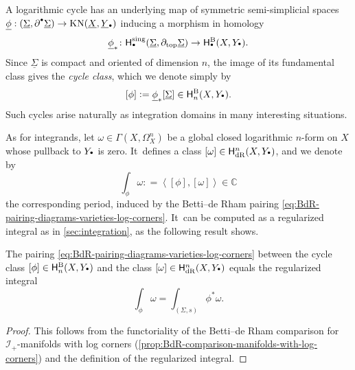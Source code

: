 \documentclass[JEP,XML,SOM,Unicode,NoFloatCountersInSection,published]{cedram}
\let\oldbullet\bullet
\renewcommand{\bullet}{{\raisebox{1pt}{$\scriptscriptstyle\oldbullet$}}}
\theoremstyle{definition}
\theoremstyle{remark}
\let\defn\emph
\newcommand{\CC}{\mathbb{C}}
\newcommand{\defas}{\mathrel{\mathop:}=}
\newcommand{\abrac}[1]{\left\langle#1\right\rangle}
\newcommand{\Sig}{\Sigma}
\newcommand{\uSig}{\underline{\Sigma}}
\newcommand{\uphi}{\underline{\phi}}
\newcommand{\uX}{\underline{X}}
\newcommand{\uY}{\underline{Y}}
\newcommand{\KN}[1]{\mathrm{KN}(#1)}
\newcommand{\sect}[1]{\mathsf{\Gamma}(#1)}
\newcommand{\HdR}[2][\bullet]{\mathsf{H}_{\mathrm{dR}}^{#1}(#2)}
\newcommand{\HlgyB}[2][\bullet]{\mathsf{H}^{\mathrm{B}}_{#1}(#2)}
\newcommand{\ascat}{\mathscr{I}_+}
\begin{document}
A logarithmic cycle has an underlying map of symmetric semi-simplicial spaces $\uphi:(\uSig,\partial^\bullet\uSig) \to \KN{\uX,\uY_\bullet}$ inducing a morphism in homology
\[
\underline{\phi}_* \colon \mathsf{H}^{\mathrm{sing}}_\bullet(\uSig,\partial_{\mathrm{top}}\uSig) \to \HlgyB{X,Y_\bullet}.
\]
Since $\uSig$ is compact and oriented of dimension $n$, the image of its fundamental class gives the \defn{cycle class}, which we denote simply by
\[
[\phi] \defas \uphi_*[\uSig] \in \HlgyB[n]{X,Y_\bullet}.
\]
Such cycles arise naturally as integration domains in many interesting situations.

As for integrands, let $\omega\in \sect{X,\Omega^n_X}$ be a global closed logarithmic $n$-form on $X$ whose pullback to $Y_\bullet$ is zero. It~defines a class $[\omega]\in\HdR[n]{X,Y_\bullet}$, and we denote by
\[
\int_\phi \omega \defas \abrac{[\phi],[\omega]} \in \CC
\]
the corresponding period, induced by the Betti--de Rham pairing \eqref{eq:BdR-pairing-diagrams-varieties-log-corners}. It~can be computed as a regularized integral as in \autoref{sec:integration}, as the following result shows.

\begin{proposition}\label{prop:how-to-compute-log-periods}
The pairing \eqref{eq:BdR-pairing-diagrams-varieties-log-corners} between the cycle class $[\phi]\in\HlgyB[n]{X,Y_\bullet}$ and the class $[\omega]\in \HdR[n]{X,Y_\bullet}$ equals the regularized integral
\[
\int_\phi \omega = \int_{(\Sig,s)}\phi^*\omega.
\]
\end{proposition}

\begin{proof}
This follows from the functoriality of the Betti--de Rham comparison for $\ascat$-manifolds with log corners (\autoref{prop:BdR-comparison-manifolds-with-log-corners}) and the definition of the regularized integral.
\end{proof}
\end{document}
